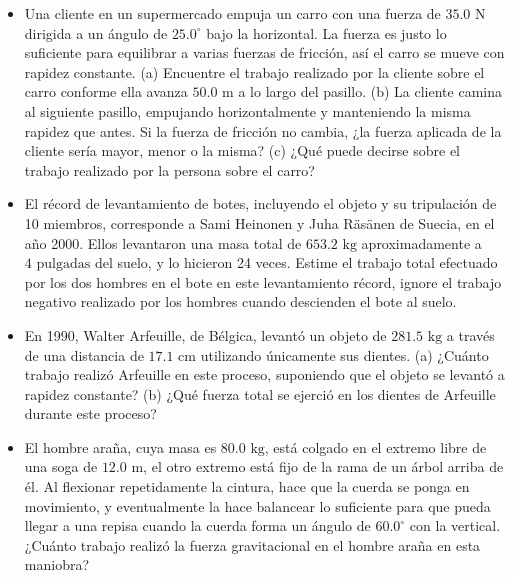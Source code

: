 \documentclass[11pt,a4paper]{article}
\begin{document}
\begin{itemize}
    \item[\textbf{1.}] Una cliente en un supermercado empuja un carro con una fuerza de $35.0 \text{ N}$ dirigida a un ángulo de $25.0^\circ$ bajo la horizontal. La fuerza es justo lo suficiente para equilibrar a varias fuerzas de fricción, así el carro se mueve con rapidez constante. (a) Encuentre el trabajo realizado por la cliente sobre el carro conforme ella avanza $50.0 \text{ m}$ a lo largo del pasillo. (b) La cliente camina al siguiente pasillo, empujando horizontalmente y manteniendo la misma rapidez que antes. Si la fuerza de fricción no cambia, ¿la fuerza aplicada de la cliente sería mayor, menor o la misma? (c) ¿Qué puede decirse sobre el trabajo realizado por la persona sobre el carro?
    \vspace*{6cm}

    \item[\textbf{2.}] El récord de levantamiento de botes, incluyendo el objeto y su tripulación de 10 miembros, corresponde a Sami Heinonen y Juha Räsänen de Suecia, en el año 2000. Ellos levantaron una masa total de $653.2 \text{ kg}$ aproximadamente a $4 \text{ pulgadas}$ del suelo, y lo hicieron 24 veces. Estime el trabajo total efectuado por los dos hombres en el bote en este levantamiento récord, ignore el trabajo negativo realizado por los hombres cuando descienden el bote al suelo.
    \vspace*{6cm}

    \item[\textbf{3.}] En 1990, Walter Arfeuille, de Bélgica, levantó un objeto de $281.5 \text{ kg}$ a través de una distancia de $17.1 \text{ cm}$ utilizando únicamente sus dientes. (a) ¿Cuánto trabajo realizó Arfeuille en este proceso, suponiendo que el objeto se levantó a rapidez constante? (b) ¿Qué fuerza total se ejerció en los dientes de Arfeuille durante este proceso?
    \vspace*{6cm}

    \item[\textbf{4.}] El hombre araña, cuya masa es $80.0 \text{ kg}$, está colgado en el extremo libre de una soga de $12.0 \text{ m}$, el otro extremo está fijo de la rama de un árbol arriba de él. Al flexionar repetidamente la cintura, hace que la cuerda se ponga en movimiento, y eventualmente la hace balancear lo suficiente para que pueda llegar a una repisa cuando la cuerda forma un ángulo de $60.0^\circ$ con la vertical. ¿Cuánto trabajo realizó la fuerza gravitacional en el hombre araña en esta maniobra?
    \vspace*{6cm}
\end{itemize}
\end{document}
